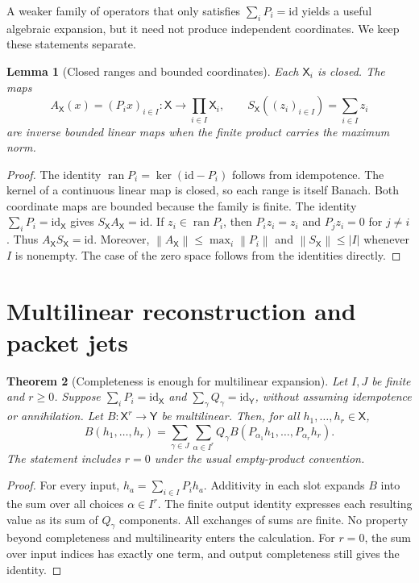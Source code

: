 \documentclass[11pt]{article}
\newtheorem{theorem}{Theorem}[section]
\newtheorem{lemma}[theorem]{Lemma}
\theoremstyle{remark}\newtheorem{remark}[theorem]{Remark}
\newcommand{\X}{\mathsf X}\newcommand{\Y}{\mathsf Y}\newcommand{\Z}{\mathsf Z}
\newcommand{\norm}[1]{\left\lVert#1\right\rVert}
\newcommand{\id}{\mathrm{id}}
\newcommand{\op}{\operatorname}
\begin{document}
A weaker family of operators that only satisfies $\sum_iP_i=\id$ yields a useful algebraic expansion, but it need not produce independent coordinates. We keep these statements separate.

\begin{lemma}[Closed ranges and bounded coordinates]\label{lem:closed}
Each $\X_i$ is closed. The maps
\[
A_{\X}(x)=(P_i x)_{i\in I}:\X\longrightarrow\prod_{i\in I}\X_i,
\qquad S_{\X}((z_i)_{i\in I})=\sum_{i\in I}z_i
\]
are inverse bounded linear maps when the finite product carries the maximum norm.
\end{lemma}
\begin{proof}
The identity $\op{ran}P_i=\ker(\id-P_i)$ follows from idempotence. The kernel of a continuous linear map is closed, so each range is itself Banach. Both coordinate maps are bounded because the family is finite. The identity $\sum_iP_i=\id_{\X}$ gives $S_{\X}A_{\X}=\id$. If $z_i\in\op{ran}P_i$, then $P_i z_i=z_i$ and $P_j z_i=0$ for $j\ne i$. Thus $A_{\X}S_{\X}=\id$. Moreover,
$\norm{A_{\X}}\le\max_i\norm{P_i}$ and
$\norm{S_{\X}}\le |I|$ whenever $I$ is nonempty. The case of the zero space follows from the identities directly.
\end{proof}

\section{Multilinear reconstruction and packet jets}
\begin{theorem}[Completeness is enough for multilinear expansion]\label{thm:reconstruction}
Let $I,J$ be finite and $r\ge0$. Suppose $\sum_iP_i=\id_{\X}$ and $\sum_\gamma Q_\gamma=\id_{\Y}$, without assuming idempotence or annihilation. Let $B:\X^r\to\Y$ be multilinear. Then, for all $h_1,\ldots,h_r\in\X$,
\begin{equation}\label{eq:recon}
B(h_1,\ldots,h_r)=\sum_{\gamma\in J}\sum_{\alpha\in I^r}
Q_\gamma B(P_{\alpha_1}h_1,\ldots,P_{\alpha_r}h_r).
\end{equation}
The statement includes $r=0$ under the usual empty-product convention.
\end{theorem}
\begin{proof}
For every input, $h_a=\sum_{i\in I}P_i h_a$. Additivity in each slot expands $B$ into the sum over all choices $\alpha\in I^r$. The finite output identity expresses each resulting value as its sum of $Q_\gamma$ components. All exchanges of sums are finite. No property beyond completeness and multilinearity enters the calculation. For $r=0$, the sum over input indices has exactly one term, and output completeness still gives the identity.
\end{proof}
\end{document}
